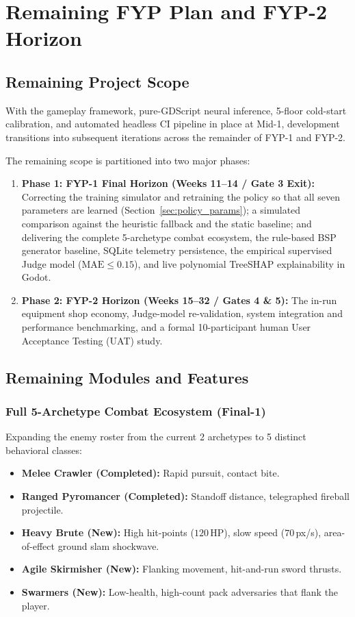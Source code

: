 \chapter{Remaining FYP Plan and FYP-2 Horizon}
\label{chap:fyp2}

\section{Remaining Project Scope}
With the gameplay framework, pure-GDScript neural inference, 5-floor cold-start calibration, and automated headless CI pipeline in place at Mid-1, development transitions into subsequent iterations across the remainder of FYP-1 and FYP-2.

The remaining scope is partitioned into two major phases:
\begin{enumerate}
    \item \textbf{Phase 1: FYP-1 Final Horizon (Weeks 11--14 / Gate 3 Exit):} Correcting the training simulator and retraining the policy so that all seven parameters are learned (Section~\ref{sec:policy_params}); a simulated comparison against the heuristic fallback and the static baseline; and delivering the complete 5-archetype combat ecosystem, the rule-based BSP generator baseline, SQLite telemetry persistence, the empirical supervised Judge model ($\text{MAE} \le 0.15$), and live polynomial TreeSHAP explainability in Godot.
    \item \textbf{Phase 2: FYP-2 Horizon (Weeks 15--32 / Gates 4 \& 5):} The in-run equipment shop economy, Judge-model re-validation, system integration and performance benchmarking, and a formal 10-participant human User Acceptance Testing (UAT) study.
\end{enumerate}

\section{Remaining Modules and Features}

\subsection{Full 5-Archetype Combat Ecosystem (Final-1)}
Expanding the enemy roster from the current 2 archetypes to 5 distinct behavioral classes:
\begin{itemize}
    \item \textbf{Melee Crawler (Completed):} Rapid pursuit, contact bite.
    \item \textbf{Ranged Pyromancer (Completed):} Standoff distance, telegraphed fireball projectile.
    \item \textbf{Heavy Brute (New):} High hit-points ($120$\,HP), slow speed ($70$\,px/s), area-of-effect ground slam shockwave.
    \item \textbf{Agile Skirmisher (New):} Flanking movement, hit-and-run sword thrusts.
    \item \textbf{Swarmers (New):} Low-health, high-count pack adversaries that flank the player.
\end{itemize}

